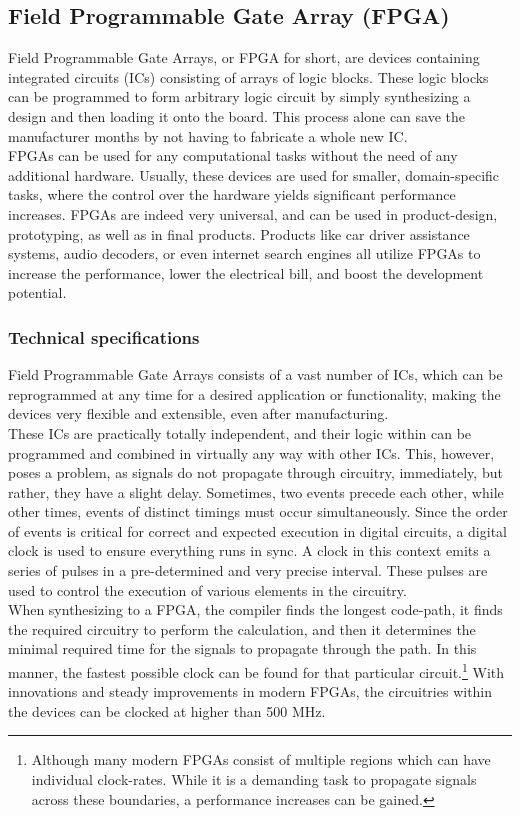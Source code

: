 \subsection{Field Programmable Gate Array (FPGA)}
Field Programmable Gate Arrays, or FPGA for short, are devices containing
integrated circuits (ICs) consisting of arrays of logic blocks.
These logic blocks can be programmed to form arbitrary logic circuit by simply
synthesizing a design and then loading it onto the board. This process alone
can save the manufacturer months by not having to fabricate a whole new IC. \\
FPGAs can be used for any computational tasks without the need of any additional
hardware. Usually, these devices are used for smaller, domain-specific tasks,
where the control over the hardware yields significant performance increases.
FPGAs are indeed very universal, and can be used in product-design, prototyping,
as well as in final products. Products like car driver assistance
systems\cite{xilinx_fpga_automotive}, audio decoders\cite{xilinx_fpga_audio},
or even internet search engines\cite{bing_search_fpga}  all utilize FPGAs to
increase the performance, lower the electrical bill, and  boost the development
potential.

\subsubsection{Technical specifications}
Field Programmable Gate Arrays consists of a vast number of ICs, which can
be reprogrammed at any time for a desired application or functionality\cite{ni_fpga},
making the devices very flexible and extensible, even after manufacturing.\\
These ICs are practically totally independent, and their logic within can be
programmed and combined in virtually any way with other ICs. This, however,
poses a problem, as signals do not propagate through circuitry, immediately, but
rather, they have a slight delay.
Sometimes, two events precede each other, while other times, events of distinct
timings must occur simultaneously.
Since the order of events is critical for correct and expected execution in
digital circuits, a digital clock is used to ensure everything runs in sync.
A clock in this context emits a series of pulses in a pre-determined and very
precise interval. These pulses are used to control the execution of various
elements in the circuitry.\\
When synthesizing to a FPGA, the compiler finds the longest code-path, it finds
the required circuitry to perform the calculation, and then it determines the
minimal required time for the signals to propagate through the path. In this
manner, the fastest possible clock can be found for that particular circuit.\footnote{
    Although many modern FPGAs consist of multiple regions which can have individual
    clock-rates. While it is a demanding task to propagate signals across these
    boundaries, a performance increases can be gained.
}
With innovations and steady improvements in modern FPGAs, the circuitries within
the devices can be clocked at higher than 500 MHz\cite{xilinx_fpga}.


